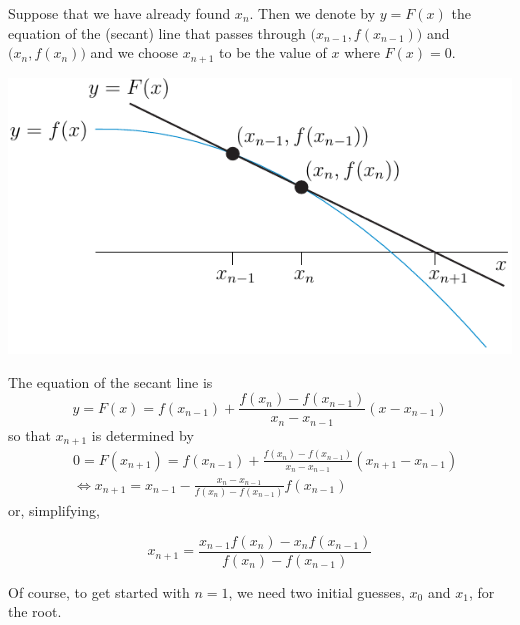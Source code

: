 Suppose that we have already found $x_n$. Then we denote by $y=F(x)$ the equation of the (secant) line that passes through 
$\big(x_{n-1}, f(x_{n-1})\big)$  and $\big(x_n,f(x_n)\big)$ and we choose $x_{n+1}$ to be the value of $x$ where $F(x)=0$. 
\begin{efig}
\begin{center}
   \includegraphics{secant}
\end{center}
\end{efig}
The equation of the secant line is
\begin{equation*}
y = F(x) = f(x_{n-1}) + \frac{f(x_n)-f(x_{n-1})}{x_n-x_{n-1}}(x-x_{n-1})
\end{equation*}
so that $x_{n+1}$ is determined by
\begin{align*}
&0=F(x_{n+1}) = f(x_{n-1}) + 
    \frac{f(x_n)-f(x_{n-1})}{x_n-x_{n-1}}(x_{n+1}-x_{n-1})
 \\
& \iff x_{n+1}= x_{n-1} - \frac{x_n-x_{n-1}}{f(x_n)-f(x_{n-1})} f(x_{n-1})
\end{align*}
or, simplifying,
\begin{impeqn}\label{eq:APPsecant}
  \begin{equation*}
    x_{n+1}=\frac{x_{n-1} f(x_n) - x_n f(x_{n-1}) }{f(x_n)-f(x_{n-1})}
  \end{equation*}
\end{impeqn}
Of course, to get started with $n=1$, we need two initial guesses, $x_0$ and $x_1$, for the root.


